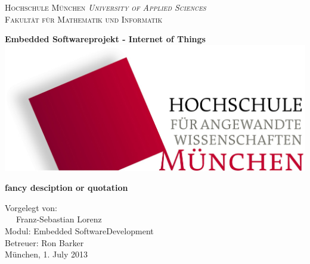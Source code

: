 \begin{titlepage}
	\textsc{Hochschule München \emph{University of Applied Sciences}\\
		\small{Fakultät für Mathematik und Informatik}}
	\vspace*{1cm}
	\begin{center}
		\huge
		\textbf{Embedded Softwareprojekt - Internet of Things}\\

        \vspace{1.5cm}
		\centering
		\includegraphics[width=.5\textwidth]{kapitel/titel/hm}
		\vspace{1.5cm}
		
		\Large
		\textbf{fancy desciption or quotation} \\

		\end{center}
		
	\normalsize
	\vfill
	Vorgelegt von: \\
	\verb+  + Franz-Sebastian Lorenz \\

	
	Modul: Embedded SoftwareDevelopment\\
	Betreuer: Ron Barker\\
	München, 1. July 2013
	
	
\end{titlepage}
